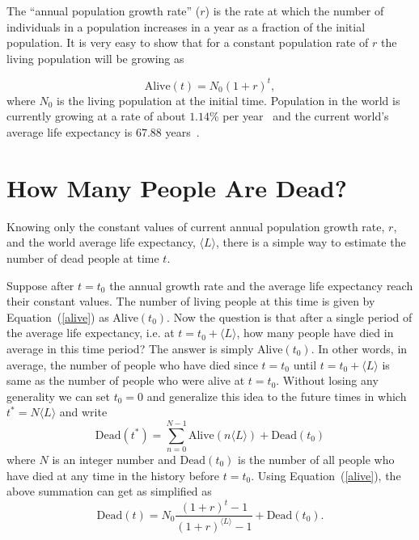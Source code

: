 \documentclass[DIV=calc, paper=a4, fontsize=11pt, twocolumn]{scrartcl}	 %
\begin{document}
The ``annual population growth rate'' ($r$) is the rate at which the number of individuals in a population increases in a year as a fraction of the initial population. It is very easy to show that for a constant population rate of $r$ the living population will be growing as 

\begin{equation}
\text{Alive}(t) = N_0 (1+r)^t,
\label{alive}
\end{equation}
where $N_0$ is the living population at the initial time. Population in the world is currently growing at a rate of  about $1.14\%$ per year~\cite{worldometers} and the current world's average life expectancy is $67.88$ years~\cite{wikipedia}. 

\section*{How Many People Are Dead?}
Knowing only the constant values of current annual population growth rate, $r$, and the world average life expectancy, $\langle L\rangle$, there is a simple way to estimate the number of dead people at time $t$. 

Suppose after $t=t_0$ the annual growth rate and the average life expectancy reach their constant values. The number of living people at this time is given by Equation~(\ref{alive}) as Alive$(t_0)$. Now the question is that after a single period of the average life expectancy, i.e. at $t=t_0+\langle L\rangle$, how many people have died in average in this time period? The answer is simply Alive$(t_0)$. In other words, in average, the number of people who have died since $t=t_0$ until $t=t_0+\langle L\rangle$ is same as the number of people who were alive at $t=t_0$. Without losing any generality we can set $t_0=0$ and generalize this idea to the future times in which $t^*=N \langle L\rangle$ and write
\begin{equation}
\text{Dead}(t^*) = \sum_{n=0}^{N-1} \text{Alive}(n \langle L\rangle)+ \text{Dead}(t_0) 
\end{equation}
where $N$ is an integer number and $\text{Dead}(t_0)$ is the number of all people who have died at any time in the history before $t=t_0$. Using Equation~(\ref{alive}), the above summation can get as simplified as
\begin{equation}
\text{Dead}(t) = N_0 \frac{(1+r)^{t}-1}{(1+r)^{\langle L\rangle}-1} + \text{Dead}(t_0).
\label{dead}
\end{equation}
\end{document}
